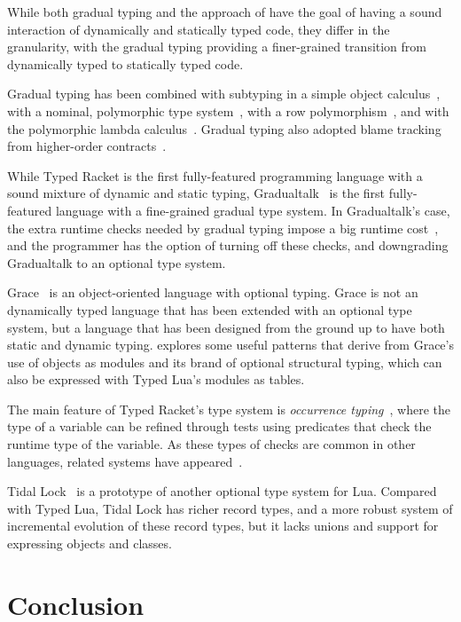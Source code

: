 \documentclass[preprint]{sig-alternate}
\begin{document}
While both gradual typing and the approach of
\citep{tobin-hochstadt2006ims} have the goal of
having a sound interaction of dynamically and statically
typed code, they differ in the granularity, with the
gradual typing providing a finer-grained transition from
dynamically typed to statically typed code.

Gradual typing has been combined with subtyping in
a simple object calculus~\citet{siek2007objects}, with
a nominal, polymorphic type system~\citet{ina:gradual},
with a row polymorphism~\citet{tobin:gradual},
and with the polymorphic lambda calculus~\citet{ahmed2011bfa}.
Gradual typing also adopted blame tracking from
higher-order
contracts~\citet{siek2010blame,ahmed2001bfa,wadler2009wpc}.

While Typed Racket is the first fully-featured programming
language with a sound mixture of dynamic and static typing,
Gradualtalk~\citep{allende2013gts} is the first 
fully-featured language with a fine-grained gradual type
system. In Gradualtalk's case, the extra runtime checks
needed by gradual typing impose a big runtime
cost~\citep{allende2013cis}, and the programmer has the
option of turning off these checks, and downgrading
Gradualtalk to an optional type system.

Grace~\citet{black2013sg} is an object-oriented language
with optional typing. Grace is not an dynamically typed
language that has been extended with an optional type system,
but a language that has been designed from the ground up
to have both static and dynamic typing. \citet{homer2013modules}
explores some useful patterns that derive from Grace's
use of objects as modules and its brand of optional
structural typing, which can also be expressed with
Typed Lua's modules as tables.

The main feature of Typed Racket's type system is
{\em occurrence typing}~\citep{tobin:occur}, where
the type of a variable can be refined through tests
using predicates that check the runtime type of
the variable. As these types of checks are common in
other languages, related systems have
appeared~\citep{guha:flow,winther:flow,pearce:whiley}.

Tidal Lock~\citep{tidallock} is a prototype of another optional
type system for Lua. Compared with Typed Lua, Tidal Lock
has richer record types, and a more robust system of
incremental evolution of these record types, but it lacks
unions and support for expressing objects and classes.

\section{Conclusion}
\label{sec:con}
\end{document}

